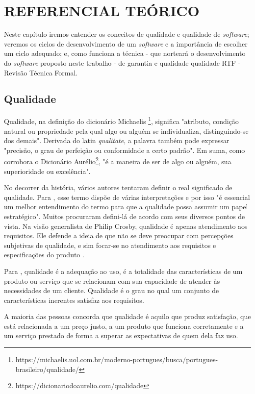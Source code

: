 %
%

\chapter{REFERENCIAL TEÓRICO}\label{chap:referencial}

Neste capítulo iremos entender os conceitos de qualidade e qualidade de \textit{software}; veremos os ciclos de desenvolvimento de um \textit{software} e a importância de escolher um ciclo adequado; e, como funciona a técnica - que norteará o desenvolvimento do \textit{software} proposto neste trabalho - de garantia e qualidade qualidade RTF - Revisão Técnica Formal.

\section{Qualidade}


Qualidade, na definição do dicionário Michaelis \footnote{https://michaelis.uol.com.br/moderno-portugues/busca/portugues-brasileiro/qualidade/}, significa "atributo, condição natural ou propriedade pela qual algo ou alguém se individualiza, distinguindo-se dos demais". Derivada do latin \textit{qualitate}, a palavra também pode expressar "precisão, o grau de perfeição ou conformidade a certo padrão". Em suma, como corrobora o Dicionário Aurélio\footnote{https://dicionariodoaurelio.com/qualidade}, "é a maneira de ser de algo ou alguém, sua superioridade ou excelência".

No decorrer da história, vários autores tentaram definir o real significado de qualidade. Para , esse termo dispõe de várias interpretações e por isso "é essencial um melhor entendimento do termo para que a qualidade possa assumir um papel estratégico". Muitos procuraram defini-lá de acordo com seus diversos pontos de vista. Na visão generalista de Philip Crosby, qualidade é apenas atendimento aos requisitos. Ele defende a ideia de que não se deve preocupar com percepções subjetivas de qualidade, e sim focar-se no atendimento aos requisitos e especificações do produto \cite{CROSBY1979}.

Para , qualidade é a adequação ao uso, é a totalidade das características de um produto ou serviço que se relacionam com sua capacidade de atender às necessidades de um cliente. Qualidade é o grau no qual um conjunto de características inerentes satisfaz aos requisitos. \cite{ISO90002005}

\begin{citacao}

A maioria das pessoas concorda que qualidade é aquilo que produz satisfação, que está relacionada a um preço justo, a um produto que funciona corretamente e a um serviço prestado de forma a superar as expectativas de quem dela faz uso. \cite[p. 52]{VERGUEIRO2002} 

\end{citacao}


